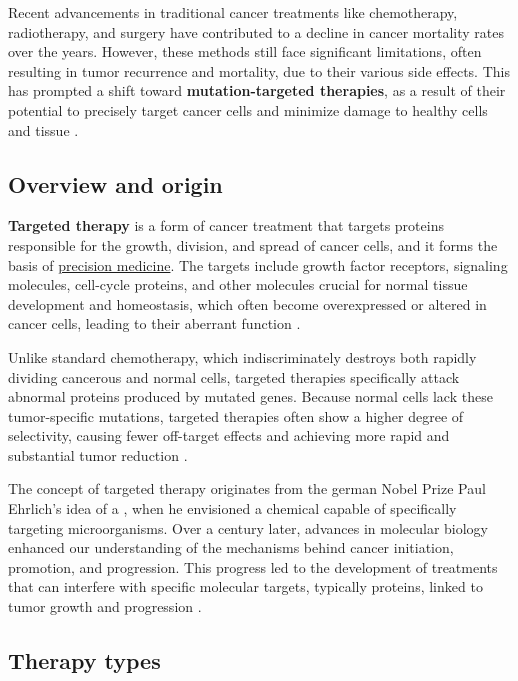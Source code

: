 Recent advancements in traditional cancer treatments like chemotherapy, radiotherapy, and surgery have contributed to a decline in cancer mortality rates over the years. However, these methods still face significant limitations, often resulting in tumor recurrence and mortality, due to their various side effects. This has prompted a shift toward \textbf{mutation-targeted therapies}, as a result of their potential to precisely target cancer cells and minimize damage to healthy cells and tissue \cite{target_therapy1, jci}.

\subsection{Overview and origin}

\textbf{Targeted therapy} is a form of cancer treatment that targets proteins responsible for the growth, division, and spread of cancer cells, and it forms the basis of \href{https://en.wikipedia.org/wiki/Personalized_medicine}{precision medicine}. The targets include growth factor receptors, signaling molecules, cell-cycle proteins, and other molecules crucial for normal tissue development and homeostasis, which often become overexpressed or altered in cancer cells, leading to their aberrant function \cite{se_tt}.

Unlike standard chemotherapy, which indiscriminately destroys both rapidly dividing cancerous and normal cells, targeted therapies specifically attack abnormal proteins produced by mutated genes. Because normal cells lack these tumor-specific mutations, targeted therapies often show a higher degree of selectivity, causing fewer off-target effects and achieving more rapid and substantial tumor reduction \cite{jci}.

The concept of targeted therapy originates from the german Nobel Prize Paul Ehrlich's idea of a  \cite{ehrlich}, when he envisioned a chemical capable of specifically targeting microorganisms. Over a century later, advances in molecular biology enhanced our understanding of the mechanisms behind cancer initiation, promotion, and progression. This progress led to the development of treatments that can interfere with specific molecular targets, typically proteins, linked to tumor growth and progression \cite{se_tt}.

\subsection{Therapy types}


